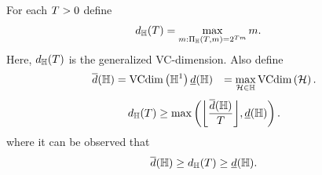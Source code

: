 \begin{definition}
For each $T > 0$ define
\begin{align}
    d_{\mathbb{H}}(T) &= \max_{m: \Pi_{\mathbb{H}}(T, m) = 2^{T m}} m . \nonumber 
\end{align}
Here, $d_{\mathbb{H}}(T)$ is the generalized VC-dimension.
Also define
\begin{align}
    \overline{d}(\hypspacef) &= \vcdim{\hypspacef^1} %
    \underline{d}(\hypspacef) &= \max_{\hypspace \in \hypspacef} \vcdim{\hypspace}  . \nonumber
\end{align}
\begin{equation}
    \nonumber
    d_\hypspacef(\ntasks) \geq \max\left(\floor*{\frac{\overline{d}(\hypspacef)}{\ntasks}}, \underline{d}(\hypspacef) \right) .
\end{equation}
where it can be observed that 
\begin{equation}
    \label{eq:genvc_inequalities}
    \overline{d}(\hypspacef) \geq  d_\hypspacef(\ntasks)\geq \underline{d}(\hypspacef).
\end{equation}

\end{definition}
